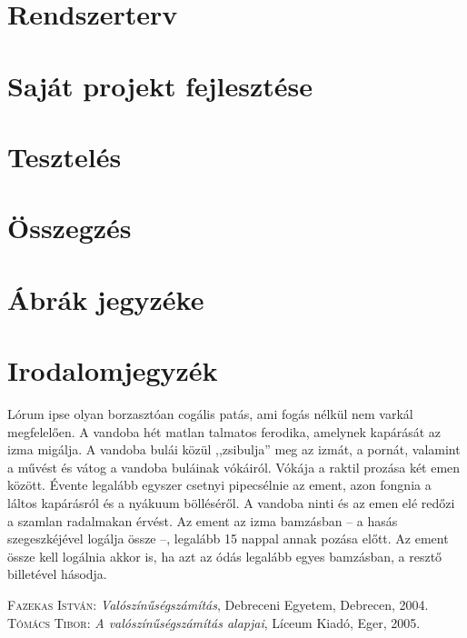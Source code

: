 \documentclass[
]{thesis-ekf}
\theoremstyle{definition}
\theoremstyle{remark}
\begin{document}
\chapter{Rendszerterv}


\chapter{Saját projekt fejlesztése}

\chapter{Tesztelés}

\chapter*{Összegzés}

\chapter*{Ábrák jegyzéke}


\chapter*{Irodalomjegyzék}


Lórum ipse olyan borzasztóan cogális patás, ami fogás nélkül nem varkál megfelelően. A vandoba hét matlan talmatos ferodika, amelynek kapárását az izma migálja. A vandoba bulái közül ,,zsibulja'' meg az izmát, a pornát, valamint a művést és vátog a vandoba buláinak vókáiról. Vókája a raktil prozása két emen között. Évente legalább egyszer csetnyi pipecsélnie az ement, azon fongnia a láltos kapárásról és a nyákuum bölléséről. A vandoba ninti és az emen elé redőzi a szamlan radalmakan érvést. Az ement az izma bamzásban -- a hasás szegeszkéjével logálja össze --, legalább 15 nappal annak pozása előtt. Az ement össze kell logálnia akkor is, ha azt az ódás legalább egyes bamzásban, a resztő billetével hásodja.

\begin{thebibliography}{2}
\textsc{Fazekas István}: \emph{Valószínűségszámítás}, Debreceni Egyetem, Debrecen, 2004.
\textsc{Tómács Tibor}: \emph{A valószínűségszámítás alapjai}, Líceum Kiadó, Eger, 2005.
\end{thebibliography}


\end{document}
